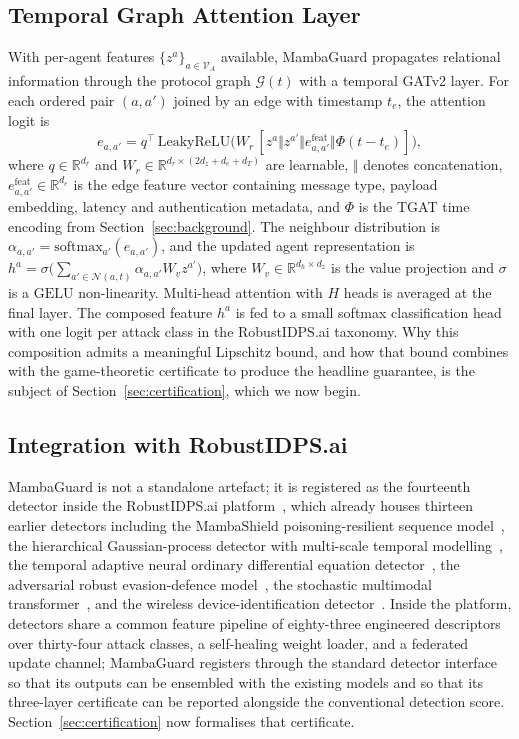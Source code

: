 \documentclass[journal,10pt,twocolumn]{IEEEtran}
\newcommand{\R}{\mathbb{R}}
\newcommand{\calG}{\mathcal{G}}
\newcommand{\calN}{\mathcal{N}}
\newcommand{\calV}{\mathcal{V}}
\begin{document}
\subsection{Temporal Graph Attention Layer}
\label{sec:gat}
With per-agent features $\{z^{a}\}_{a\in\calV_{A}}$ available, MambaGuard propagates relational information through the protocol graph $\calG(t)$ with a temporal GATv2 layer. For each ordered pair $(a,a')$ joined by an edge with timestamp $t_{e}$, the attention logit is
\begin{equation}
e_{a,a'} = q^{\top}\,\mathrm{LeakyReLU}\!\bigl(W_{r}\,[z^{a}\Vert z^{a'}\Vert e_{a,a'}^{\text{feat}}\Vert\Phi(t-t_{e})]\bigr),
\label{eq:gatv2}
\end{equation}
where $q\in\R^{d_{r}}$ and $W_{r}\in\R^{d_{r}\times(2d_{z}+d_{e}+d_{T})}$ are learnable, $\Vert$ denotes concatenation, $e_{a,a'}^{\text{feat}}\in\R^{d_{e}}$ is the edge feature vector containing message type, payload embedding, latency and authentication metadata, and $\Phi$ is the TGAT time encoding from Section~\ref{sec:background}. The neighbour distribution is $\alpha_{a,a'}=\mathrm{softmax}_{a'}(e_{a,a'})$, and the updated agent representation is $h^{a}=\sigma\bigl(\sum_{a'\in\calN(a,t)}\alpha_{a,a'}W_{v}z^{a'}\bigr)$, where $W_{v}\in\R^{d_{h}\times d_{z}}$ is the value projection and $\sigma$ is a $\mathrm{GELU}$ non-linearity. Multi-head attention with $H$ heads is averaged at the final layer. The composed feature $h^{a}$ is fed to a small softmax classification head with one logit per attack class in the RobustIDPS.ai taxonomy. Why this composition admits a meaningful Lipschitz bound, and how that bound combines with the game-theoretic certificate to produce the headline guarantee, is the subject of Section~\ref{sec:certification}, which we now begin.

\subsection{Integration with RobustIDPS.ai}
\label{sec:integration}
MambaGuard is not a standalone artefact; it is registered as the fourteenth detector inside the RobustIDPS.ai platform~\cite{Anonymous2026RobustIDPS}, which already houses thirteen earlier detectors including the MambaShield poisoning-resilient sequence model~\cite{Anonymous2026MambaShield}, the hierarchical Gaussian-process detector with multi-scale temporal modelling~\cite{Anonymous2026HGP}, the temporal adaptive neural ordinary differential equation detector~\cite{Anonymous2026TANODE}, the adversarial robust evasion-defence model~\cite{Anonymous2024Adversarial}, the stochastic multimodal transformer~\cite{Anonymous2025SMT}, and the wireless device-identification detector~\cite{Anonymous2024ElCon}. Inside the platform, detectors share a common feature pipeline of eighty-three engineered descriptors over thirty-four attack classes, a self-healing weight loader, and a federated update channel; MambaGuard registers through the standard detector interface so that its outputs can be ensembled with the existing models and so that its three-layer certificate can be reported alongside the conventional detection score. Section~\ref{sec:certification} now formalises that certificate.
\end{document}

